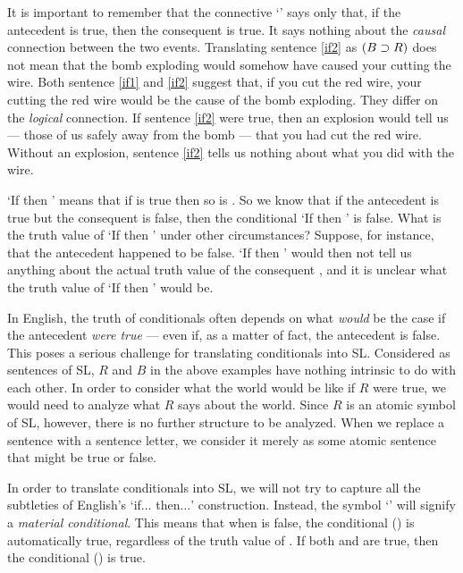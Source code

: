 It is important to remember that the connective `\eif' says only that, if the antecedent is true, then the consequent is true. It says nothing about the \emph{causal} connection between the two events. Translating sentence \ref{if2} as $(B \supset R)$ does not mean that the bomb exploding would somehow have caused your cutting the wire. Both sentence \ref{if1} and \ref{if2} suggest that, if you cut the red wire, your cutting the red wire would be the cause of the bomb exploding. They differ on the \emph{logical} connection. If sentence \ref{if2} were true, then an explosion would tell us --- those of us safely away from the bomb --- that you had cut the red wire. Without an explosion, sentence \ref{if2} tells us nothing about what you did with the wire.



`If \metaA{} then \metaB{}' means that if \metaA{} is true then so is \metaB{}. So we know that if the antecedent \metaA{} is true but the consequent \metaB{} is false, then the conditional `If \metaA{} then \metaB{}' is false. What is the truth value of `If \metaA{} then \metaB{}' under other circumstances? Suppose, for instance, that the antecedent \metaA{} happened to be false. `If \metaA{} then \metaB{}' would then not tell us anything about the actual truth value of the consequent \metaB{}, and it is unclear what the truth value of `If \metaA{} then \metaB{}' would be.

In English, the truth of conditionals often depends on what \emph{would} be the case if the antecedent \emph{were true} --- even if, as a matter of fact, the antecedent is false. This poses a serious challenge for translating conditionals into SL.  Considered as sentences of SL, $R$ and $B$ in the above examples have nothing intrinsic to do with each other. In order to consider what the world would be like if $R$ were true, we would need to analyze what $R$ says about the world. Since $R$ is an atomic symbol of SL, however, there is no further structure to be analyzed. When we replace a sentence with a sentence letter, we consider it merely as some atomic sentence that might be true or false.

In order to translate conditionals into SL, we will not try to capture all the subtleties of English's `if$\ldots$ then$\ldots$' construction. Instead, the symbol `\eif' will signify a \emph{material conditional}. This means that when \metaA{} is false, the conditional (\metaA{}\eif\metaB{}) is automatically true, regardless of the truth value of \metaB{}. If both \metaA{} and \metaB{} are true, then the conditional (\metaA{}\eif\metaB{}) is true.



